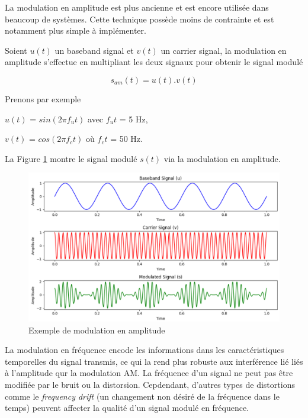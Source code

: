 La modulation en amplitude est plus ancienne et est encore utilisée dans beaucoup de systèmes. Cette technique possède moins de contrainte et est notamment plus simple à implémenter.

\vspace{0.1cm}

Soient $u(t)$ un baseband signal et $v(t)$ un carrier signal, la modulation en amplitude s'effectue en multipliant les deux signaux pour obtenir le signal modulé 

\begin{equation}\label{eq2}
s_{am}(t) = u(t) . v(t)
\end{equation}

Prenons par exemple 

$u(t)$ = $sin(2\pi f_{u}t)$ avec $f_{u}t$ = 5 Hz,

$v(t)$ = $cos(2\pi f_{c}t)$ où $f_{c}t$ = 50 Hz.

La Figure \ref{term1} montre le signal modulé $s(t)$ via la modulation en amplitude.

\newpage

\begin{figure}[h]
\centering

\includegraphics[scale=0.5]{images/AM_mod.PNG}
\caption{Exemple de modulation en amplitude}\label{term1}
\end{figure}


La modulation en fréquence encode les informations dans les caractéristiques temporelles du signal transmis, ce qui la rend plus robuste aux interférence lié liés à l'amplitude qur la modulation AM. La fréquence d'un signal ne peut pas être modifiée par le bruit ou la distorsion. Cepdendant, d'autres types de distortions comme le \textit{frequency drift} (un changement non désiré de la fréquence dans le temps) peuvent affecter la qualité d'un signal modulé en fréquence.

